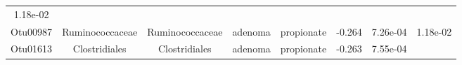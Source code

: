 \documentclass[11pt,]{article}
\begin{document}
\begin{longtable}[]{@{}cccccccc@{}}
\begin{minipage}[t]{0.08\columnwidth}
1.18e-02\strut
\end{minipage}\tabularnewline
\begin{minipage}[t]{0.08\columnwidth}\centering\strut
Otu00987\strut
\end{minipage} & \begin{minipage}[t]{0.15\columnwidth}\centering\strut
Ruminococcaceae\strut
\end{minipage} & \begin{minipage}[t]{0.15\columnwidth}\centering\strut
Ruminococcaceae\strut
\end{minipage} & \begin{minipage}[t]{0.08\columnwidth}\centering\strut
adenoma\strut
\end{minipage} & \begin{minipage}[t]{0.09\columnwidth}\centering\strut
propionate\strut
\end{minipage} & \begin{minipage}[t]{0.07\columnwidth}\centering\strut
-0.264\strut
\end{minipage} & \begin{minipage}[t]{0.08\columnwidth}\centering\strut
7.26e-04\strut
\end{minipage} & \begin{minipage}[t]{0.08\columnwidth}\centering\strut
1.18e-02\strut
\end{minipage}\tabularnewline
\begin{minipage}[t]{0.08\columnwidth}\centering\strut
Otu01613\strut
\end{minipage} & \begin{minipage}[t]{0.15\columnwidth}\centering\strut
Clostridiales\strut
\end{minipage} & \begin{minipage}[t]{0.15\columnwidth}\centering\strut
Clostridiales\strut
\end{minipage} & \begin{minipage}[t]{0.08\columnwidth}\centering\strut
adenoma\strut
\end{minipage} & \begin{minipage}[t]{0.09\columnwidth}\centering\strut
propionate\strut
\end{minipage} & \begin{minipage}[t]{0.07\columnwidth}\centering\strut
-0.263\strut
\end{minipage} & \begin{minipage}[t]{0.08\columnwidth}\centering\strut
7.55e-04\strut
\end{minipage} & \begin{minipage}[t]{0.08\columnwidth}\centering\strut

\end{minipage}
\end{longtable}
\end{document}
